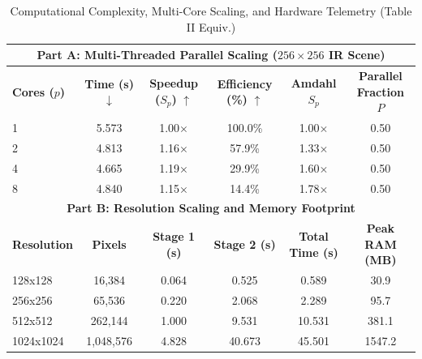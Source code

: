\begin{table}[t]
\centering
\caption{Computational Complexity, Multi-Core Scaling, and Hardware Telemetry (Table II Equiv.)}
\label{tab:runtime_scaling}
\begin{tabular}{lccccc}
\hline\hline
\multicolumn{6}{c}{\textbf{Part A: Multi-Threaded Parallel Scaling ($256 \times 256$ IR Scene)}} \\
\hline
\textbf{Cores ($p$)} & \textbf{Time (s)} $\downarrow$ & \textbf{Speedup ($S_p$)} $\uparrow$ & \textbf{Efficiency (\%)} $\uparrow$ & \textbf{Amdahl $S_p$} & \textbf{Parallel Fraction $P$} \\
\hline
1 & 5.573 & 1.00$\times$ & 100.0\% & 1.00$\times$ & 0.50 \\
2 & 4.813 & 1.16$\times$ & 57.9\% & 1.33$\times$ & 0.50 \\
4 & 4.665 & 1.19$\times$ & 29.9\% & 1.60$\times$ & 0.50 \\
8 & 4.840 & 1.15$\times$ & 14.4\% & 1.78$\times$ & 0.50 \\
\hline
\multicolumn{6}{c}{\textbf{Part B: Resolution Scaling and Memory Footprint}} \\
\hline
\textbf{Resolution} & \textbf{Pixels} & \textbf{Stage 1 (s)} & \textbf{Stage 2 (s)} & \textbf{Total Time (s)} & \textbf{Peak RAM (MB)} \\
\hline
128x128 & 16,384 & 0.064 & 0.525 & 0.589 & 30.9 \\
256x256 & 65,536 & 0.220 & 2.068 & 2.289 & 95.7 \\
512x512 & 262,144 & 1.000 & 9.531 & 10.531 & 381.1 \\
1024x1024 & 1,048,576 & 4.828 & 40.673 & 45.501 & 1547.2 \\
\hline\hline
\end{tabular}
\end{table}